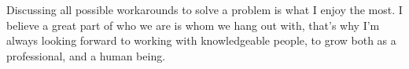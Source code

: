 

\begin{cvparagraph}

   	Discussing all possible workarounds to solve a problem is what I enjoy the most. I believe a great part of who we are is whom we hang out with, that’s why I’m always looking forward to working with knowledgeable people, to grow both as a professional, and a human being.
\end{cvparagraph}
